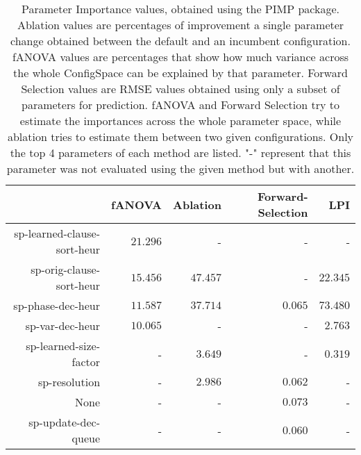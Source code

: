 \begin{table}
\begin{tabular}{r|r|r|r|r}
\toprule
                            &      fANOVA       &     Ablation      & Forward-Selection &        LPI       \\
\hline
sp-learned-clause-sort-heur & $         21.296$ &                 - &                 - &                 -\\
sp-orig-clause-sort-heur    & $         15.456$ & $         47.457$ &                 - & $         22.345$\\
sp-phase-dec-heur           & $         11.587$ & $         37.714$ & $          0.065$ & $         73.480$\\
sp-var-dec-heur             & $         10.065$ &                 - &                 - & $          2.763$\\
sp-learned-size-factor      &                 - & $          3.649$ &                 - & $          0.319$\\
sp-resolution               &                 - & $          2.986$ & $          0.062$ &                 -\\
None                        &                 - &                 - & $          0.073$ &                 -\\
sp-update-dec-queue         &                 - &                 - & $          0.060$ &                 -\\
\bottomrule
\end{tabular}
\caption{Parameter Importance values, obtained using the PIMP package. Ablation values are percentages of improvement a single parameter change obtained between the default and an incumbent configuration.
fANOVA values are percentages that show how much variance across the whole ConfigSpace can be explained by that parameter.
Forward Selection values are RMSE values obtained using only a subset of parameters for prediction.
fANOVA and Forward Selection try to estimate the importances across the whole parameter space, while ablation tries to estimate them between two given configurations.
Only the top 4 parameters of each method are listed.
                    "-" represent that this parameter was not evaluated
                     using the given method but with another.
                    }
\label{tab:pimp}
\end{table}
